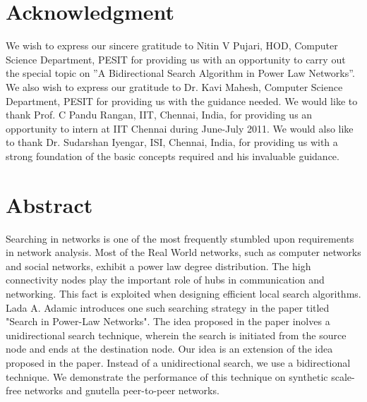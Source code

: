 \documentclass[a4paper,12pt]{article}
\begin{document}
\renewcommand*\rmdefault{ppl}\normalfont\upshape
\renewcommand{\headrulewidth}{0.5pt}
\renewcommand{\footrulewidth}{0.5pt}

\pagestyle{fancy}





\newpage
\section*{\Huge{Acknowledgment}}
We wish to express our sincere gratitude to Nitin V Pujari, HOD, Computer Science Department, PESIT for providing us with an opportunity to carry out the special topic on ''A Bidirectional Search Algorithm in Power Law Networks''. We also wish to express our gratitude to Dr. Kavi Mahesh, Computer Science Department, PESIT for providing us with the guidance needed. We would like to thank Prof. C Pandu Rangan, IIT, Chennai, India, for providing us an opportunity to intern at IIT Chennai during June-July 2011. We would also like to thank Dr. Sudarshan Iyengar, ISI, Chennai, India, for providing us with a strong foundation of the basic concepts required and his invaluable guidance.

\newpage
\section*{\Huge{Abstract}}
Searching in networks is one of the most frequently stumbled upon requirements in network analysis. Most of the Real World networks, such as computer networks and social networks, exhibit a power law degree distribution. The high connectivity nodes play the important role of hubs in communication and networking. This fact is exploited when designing efficient local search algorithms. Lada A. Adamic introduces one such searching strategy in the paper titled "Search in Power-Law Networks". The idea proposed in the paper inolves a unidirectional search technique, wherein the search is initiated from the source node and ends at the destination node. Our idea is an extension of the idea proposed in the paper. Instead of a unidirectional search, we use a bidirectional technique. We demonstrate the performance of this technique on synthetic scale-free networks and gnutella peer-to-peer networks.
\newpage

\newpage
\tableofcontents



\cfoot{\thepage}
\end{document}
